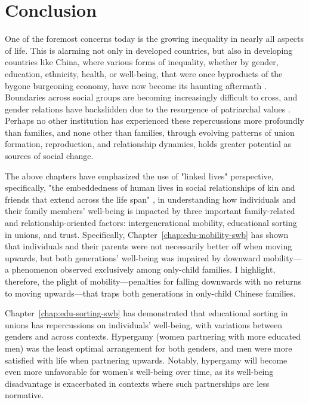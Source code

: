 \chapter{Conclusion}
\label{chap:conclusion}

One of the foremost concerns today is the growing inequality in nearly all aspects of life. This is alarming not only in developed countries, but also in developing countries like China, where various forms of inequality, whether by gender, education, ethnicity, health, or well-being, that were once byproducts of the bygone burgeoning economy, have now become its haunting aftermath \parencite{sicularUrbanRuralIncomeGap2007,xieIncomeInequalityTodays2014,yeungHigherEducationExpansion2013}. Boundaries across social groups are becoming increasingly difficult to cross, and gender relations have backslidden due to the resurgence of patriarchal values \parencite{jiUnequalCareUnequal2017}. Perhaps no other institution has experienced these repercussions more profoundly than families, and none other than families, through evolving patterns of union formation, reproduction, and relationship dynamics, holds greater potential as sources of social change.

The above chapters have emphasized the use of "linked lives" perspective, specifically, "the embeddedness of human lives in social relationships of kin and friends that extend across the life span" \parencite[859]{macmillanFamiliesLifeCourse2005}, in understanding how individuals and their family members' well-being is impacted by three important family-related and relationship-oriented factors: intergenerational mobility, educational sorting in unions, and trust. Specifically, Chapter~\ref{chap:edu-mobility-swb} has shown that individuals and their parents were not necessarily better off when moving upwards, but both generations' well-being was impaired by downward mobility—a phenomenon observed exclusively among only-child families. I highlight, therefore, the plight of mobility—penalties for falling downwards with no returns to moving upwards—that traps both generations in only-child Chinese families.

Chapter~\ref{chap:edu-sorting-swb} has demonstrated that educational sorting in unions has repercussions on individuals' well-being, with variations between genders and across contexts. Hypergamy (women partnering with more educated men) was the least optimal arrangement for both genders, and men were more satisfied with life when partnering upwards. Notably, hypergamy will become even more unfavorable for women's well-being over time, as its well-being disadvantage is exacerbated in contexts where such partnerships are less normative.

